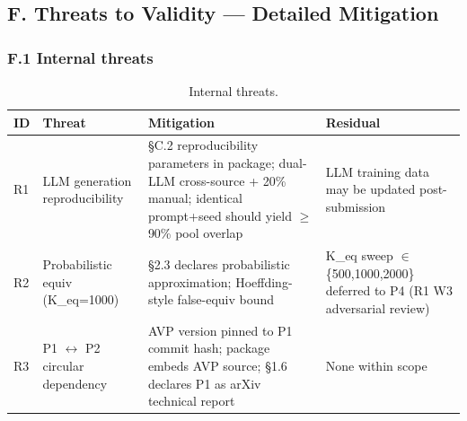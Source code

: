 \documentclass[review,12pt,authoryear]{elsarticle}
\begin{document}

\subsection{F. Threats to Validity --- Detailed Mitigation}\label{f.-threats-to-validity-detailed-mitigation}

\subsubsection{F.1 Internal threats}\label{f.1-internal-threats}

{\def\LTcaptype{table} %
\begin{longtable}[]{@{}
  >{\raggedright\arraybackslash}p{}
  >{\raggedright\arraybackslash}p{}
  >{\raggedright\arraybackslash}p{}
  >{\raggedright\arraybackslash}p{}@{}}
\caption{Internal threats.}\label{tab:p2-27}\\
\toprule\noalign{}
\begin{minipage}[b]{\linewidth}\raggedright
ID
\end{minipage} & \begin{minipage}[b]{\linewidth}\raggedright
Threat
\end{minipage} & \begin{minipage}[b]{\linewidth}\raggedright
Mitigation
\end{minipage} & \begin{minipage}[b]{\linewidth}\raggedright
Residual
\end{minipage} \\
\midrule\noalign{}
\endhead
\bottomrule\noalign{}
\endlastfoot
R1 & LLM generation reproducibility & §C.2 reproducibility parameters in
package; dual-LLM cross-source + 20\% manual; identical prompt+seed
should yield $\geq$ 90\% pool overlap & LLM training data may be updated
post-submission \\
R2 & Probabilistic equiv (K\_eq=1000) & §2.3 declares probabilistic
approximation; Hoeffding-style false-equiv bound & K\_eq sweep $\in$
\{500,1000,2000\} deferred to P4 (R1 W3 adversarial review) \\
R3 & P1 $\leftrightarrow$ P2 circular dependency & AVP version pinned to P1 commit hash;
package embeds AVP source; §1.6 declares P1 as arXiv technical report &
None within scope \\

\end{longtable}}
\end{document}
